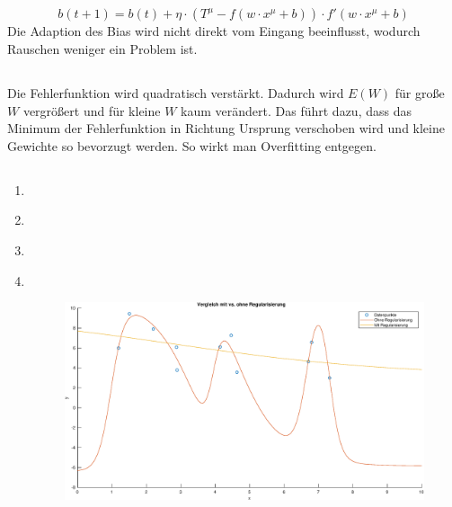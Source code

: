 \documentclass[DIN, pagenumber=false, fontsize=11pt, parskip=half]{scrartcl}
\begin{document}
    \subsection{}
    \begin{equation*}  
        b(t+1) = b(t) + \eta \cdot  (T^\mu - f(w \cdot x^\mu + b)) \cdot f'(w \cdot x^\mu + b) 
    \end{equation*}
    Die Adaption des Bias wird nicht direkt vom Eingang beeinflusst, wodurch Rauschen weniger ein Problem ist.

    \subsection{}
    Die Fehlerfunktion wird quadratisch verstärkt. Dadurch wird $E(W)$ für große 
    $W$ vergrößert und für kleine $W$ kaum verändert. Das führt dazu, dass das Minimum der Fehlerfunktion in Richtung Ursprung verschoben wird und kleine Gewichte so bevorzugt werden. So wirkt man Overfitting entgegen.


    \subsection{}
    \begin{enumerate}[label=(\alph*)]
        \item  $ $
            
        \item $ $
            
        \item $ $
            
        \item $ $
            \begin{figure}[H]
                \centering
                \includegraphics[width=\textwidth]{b08a02.eps}
            \end{figure}
    \end{enumerate}
\end{document}
